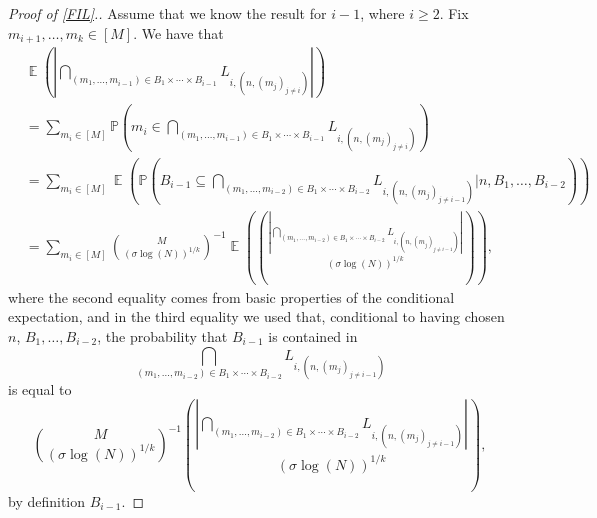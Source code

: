 \documentclass[10pt,a4paper]{amsart}
\newcommand{\E}{\operatorname{\mathbb{E}}}
\renewcommand{\P}{\mathbb{P}}
\begin{document}
\begin{proof}[Proof of \cref{FIL}.]
    Assume that we know the result for $i-1$, where $i\geq 2$. Fix $m_{i+1},\ldots,m_k\in [M]$. We have that
    \begin{align*}
        &\E\left( \left| \bigcap_{(m_1,\ldots,m_{i-1})\in  B_1\times \cdots \times B_{i-1} } L_{i,(n,(m_j)_{j\neq i })} \right| \right) \\
        & = \sum_{m_i\in [M]} \P\left(m_i \in \bigcap_{(m_1,\ldots,m_{i-1})\in  B_1\times \cdots \times B_{i-1} } L_{i,(n,(m_j)_{j\neq i })}\right)\\
        & =\sum_{m_i\in [M]} \E\left(\P\left(B_{i-1}\subseteq  \bigcap_{(m_1,\ldots,m_{i-2})\in  B_1\times \cdots \times B_{i-2} } L_{i,(n,(m_j)_{j\neq i-1 })}\Bigg| n,B_1,\ldots,B_{i-2} \right) \right)\\
        & =\sum_{m_i\in [M]} \binom{M}{(\sigma \log(N))^{1/k}}^{-1}\E\left( \binom{\left| \bigcap_{(m_1,\ldots,m_{i-2})\in  B_1\times \cdots \times B_{i-2} } L_{i,(n,(m_j)_{j\neq i-1 })} \right|}{(\sigma \log(N))^{1/k}}   \right),
    \end{align*}
where the second equality comes from basic properties of the conditional expectation, and in the third equality we used that, conditional to having chosen $n$, $B_1,\ldots,B_{i-2}$, the probability that $B_{i-1}$ is contained in
$$ \bigcap_{(m_1,\ldots,m_{i-2})\in  B_1\times \cdots \times B_{i-2} } L_{i,(n,(m_j)_{j\neq i-1 })} $$
is equal to    
$$\binom{M}{(\sigma \log(N))^{1/k}}^{-1} \binom{\left| \bigcap_{(m_1,\ldots,m_{i-2})\in  B_1\times \cdots \times B_{i-2} } L_{i,(n,(m_j)_{j\neq i-1 })} \right|}{(\sigma \log(N))^{1/k}} , $$
by definition $B_{i-1}$. 


\end{proof}
\end{document}
